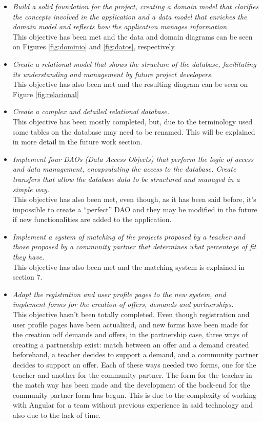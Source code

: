 \documentclass[11pt]{book}
\begin{document}
	\begin{itemize}
		\item \emph{Build a solid foundation for the project, creating a domain model that clarifies the concepts involved in the application and a data model that enriches the domain model and reflects how the application manages information.}\\
		This objective has been met and the data and domain diagrams can be seen on Figures  \ref{fig:dominio} and \ref{fig:datos}, respectively.
		\item \emph{Create a relational model that shows the structure of the database, facilitating its understanding and management by future project developers.}\\
		This objective has also been met and the resulting diagram can be seen on Figure \ref{fig:relacional}
		\item \emph{Create a complex and detailed relational database.}\\
		This objective has been mostly completed, but, due to the terminology used some tables on the database may need to be renamed. This will be explained in more detail in the future work section.
		\item \emph{Implement four DAOs (Data Access Objects) that perform the logic of access and data management, encapsulating the access to the database. Create transfers that allow the database data to be structured and managed in a simple way.}\\
		This objective has also been met, even though, as it has been said before, it's impossible to create a ``perfect'' DAO and they may be modified in the future if new functionalities are added to the application.
		\item \emph{Implement a system of matching of the projects proposed by a teacher and those proposed by a community partner that determines what percentage of fit they have.}\\
		This objective has also been met and the matching system is explained in section 7.
		\item \emph{ Adapt the registration and user profile pages to the new system, and implement forms for the creation of offers, demands and partnerships.}\\
		This objective hasn't been totally completed. Even though registration and user profile pages have been actualized, and new forms have been made for the creation odf demands and offers, in the partnership case, three ways of creating a partnership exist: match between an offer and a demand created beforehand, a teacher decides to support a demand, and a community partner decides to support an offer. Each of these ways needed two forms, one for the  teacher and another for the community partner. The form for the teacher in the match way has been made and the development of the back-end for the community partner form has begun. This is due to the complexity of working with Angular for a team without previous experience in said technology and also due to the lack of time.

\end{itemize}
\end{document}
